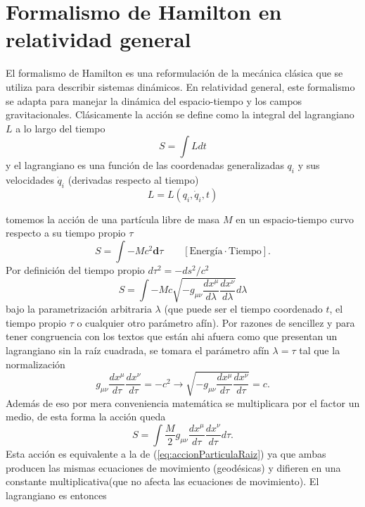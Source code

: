 \chapter{Formalismo de Hamilton en relatividad general}
\label{chap:hamilton}
El formalismo de Hamilton es una reformulación de la mecánica clásica que se utiliza para describir sistemas dinámicos. En relatividad general, este formalismo se adapta para manejar la dinámica del espacio-tiempo y los campos gravitacionales.
Clásicamente la acción se define como la integral del lagrangiano $L$ a lo largo del tiempo
\[
    S = \int L dt
\]
y el lagrangiano es una función de las coordenadas generalizadas $q_i$ y sus velocidades $\dot{q}_i$ (derivadas respecto al tiempo)
\[
    L = L(q_i, \dot{q}_i, t)
\]

tomemos la acción de una partícula libre de masa $M$ en un espacio-tiempo curvo respecto a su tiempo propio $\tau$
\begin{equation}
    S = \int -Mc^2 \mathbf{d}\tau  \qquad [\text{Energía} \cdot  \text{Tiempo}].
\end{equation}
Por definición del tiempo propio $d\tau^2 = -ds^2/c^2$
\begin{equation}
    S = \int -Mc \sqrt{-g_{\mu \nu} \frac{dx^\mu}{d\lambda} \frac{dx^\nu}{d\lambda}} d\lambda
    \label{eq:accionParticulaRaiz}
\end{equation}
bajo la parametrización arbitraria $\lambda$ (que puede ser el tiempo coordenado $t$, el tiempo propio $\tau$ o cualquier otro parámetro afín).
Por razones de sencillez y para tener congruencia con los textos que están ahi afuera como \cite[p. 45]{wald-1984} que presentan un lagrangiano sin la raíz cuadrada, se tomara el parámetro afín $\lambda = \tau$ tal que la normalización
\begin{equation}
    g_{\mu \nu} \frac{dx^\mu}{d\tau} \frac{dx^\nu}{d\tau} = -c^2 \rightarrow \sqrt{-g_{\mu \nu} \frac{dx^\mu}{d\tau} \frac{dx^\nu}{d\tau}} = c.
\end{equation}
Además de eso por mera conveniencia matemática se multiplicara por el factor un medio, de esta forma la acción queda
\begin{equation}
    S  =  \int \frac{M}{2}  g_{\mu \nu} \frac{dx^\mu}{d\tau} \frac{dx^\nu}{d\tau} d\tau.
\end{equation}
Esta acción es equivalente a la de (\ref{eq:accionParticulaRaiz}) ya que ambas producen las mismas ecuaciones de movimiento (geodésicas) y difieren en una constante multiplicativa(que no afecta las ecuaciones de movimiento).
El lagrangiano es entonces
